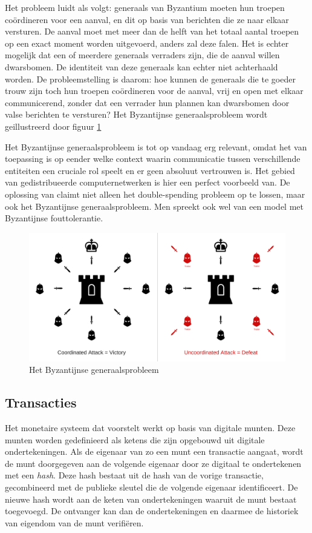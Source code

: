 			Het probleem luidt als volgt: generaals van Byzantium moeten hun troepen coördineren voor een aanval, en dit op basis van berichten die ze naar elkaar versturen. De aanval moet met meer dan de helft van het totaal aantal troepen op een exact moment worden uitgevoerd, anders zal deze falen. Het is echter mogelijk dat een of meerdere generaals verraders zijn, die de aanval willen dwarsbomen. De identiteit van deze generaals kan echter niet achterhaald worden. De probleemstelling is daarom: hoe kunnen de generaals die te goeder trouw zijn toch hun troepen coördineren voor de aanval, vrij en open met elkaar communicerend, zonder dat een verrader hun plannen kan dwarsbomen door valse berichten te versturen? Het Byzantijnse generaalsprobleem wordt geillustreerd door figuur \ref{fig:byzantium}
			
			Het Byzantijnse generaalsprobleem is tot op vandaag erg relevant, omdat het van toepassing is op eender welke context waarin communicatie tussen verschillende entiteiten een cruciale rol speelt en er geen absoluut vertrouwen is. Het gebied van gedistribueerde computernetwerken is hier een perfect voorbeeld van. De oplossing van \textcite{Nakamoto2008} claimt niet alleen het double-spending probleem op te lossen, maar ook het Byzantijnse generaalsprobleem. Men spreekt ook wel van een model met Byzantijnse fouttolerantie.
			
			\begin{figure}
				\includegraphics[width=\linewidth]{img/byzantine_generals.png}
				\caption{Het Byzantijnse generaalsprobleem}
				\label{fig:byzantium}
			\end{figure}
			
	\subsection{Transacties}
	Het monetaire systeem dat \textcite{Nakamoto2008} voorstelt werkt op basis van digitale munten. Deze munten worden gedefinieerd als ketens die zijn opgebouwd uit digitale ondertekeningen. Als de eigenaar van zo een munt een transactie aangaat, wordt de munt doorgegeven aan de volgende eigenaar door ze digitaal te ondertekenen met een \textit{hash}. Deze hash bestaat uit de hash van de vorige transactie, gecombineerd met de publieke sleutel die de volgende eigenaar identificeert. De nieuwe hash wordt aan de keten van ondertekeningen waaruit de munt bestaat toegevoegd. De ontvanger kan dan de ondertekeningen en daarmee de historiek van eigendom van de munt verifiëren. 
			
